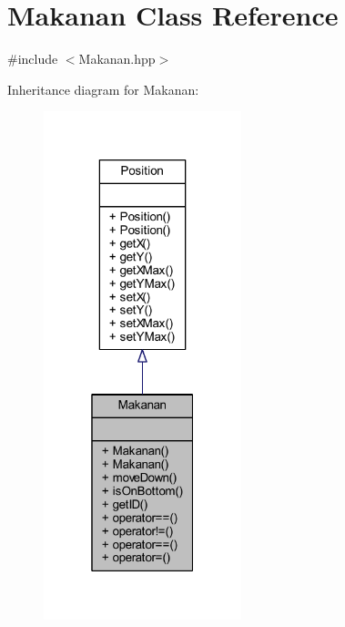 \hypertarget{class_makanan}{}\section{Makanan Class Reference}
\label{class_makanan}


{\ttfamily \#include $<$Makanan.\+hpp$>$}



Inheritance diagram for Makanan\+:
\nopagebreak
\begin{figure}[H]
\begin{center}
\leavevmode
\includegraphics[width=163pt]{class_makanan__inherit__graph}
\end{center}
\end{figure}


